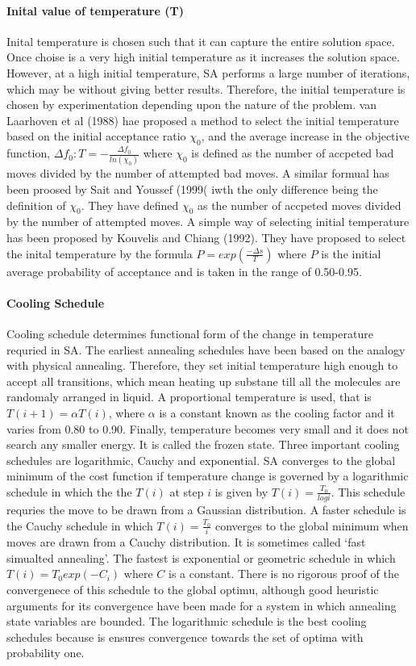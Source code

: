 \documentclass[pdftex,11pt]{article}
\begin{document}
\paragraph{Inital value of temperature (T)}
Inital temperature is chosen such that it can capture the entire solution space. Once choise is a very high initial temperature as it increases the solution space. However, at a high initial temperature, SA performs a large number of iterations, which may be without giving better results. Therefore, the initial temperature is chosen by experimentation depending upon the nature of the problem. van Laarhoven et al (1988) hae proposed a method to select the initial temperature based on the initial acceptance ratio $\chi_0$, and the average increase in the objective function, $\Delta f_0: T = -\frac{\Delta f_0}{ln(\chi_0)}$ where $\chi_0$ is defined as the number of accpeted bad moves divided by the number of attempted bad moves. A similar formual has been proosed by Sait and Youssef (1999( iwth the only difference being the definition of $\chi_0$. They have defined $\chi_0$ as the number of accpeted moves divided by the number of attempted moves. A simple way of selecting initial temperature has been proposed by Kouvelis and Chiang (1992). They have proposed to select the inital temperature by the formula $P = exp(\frac{-\Delta s}{T})$ where $P$ is the initial average probability of acceptance and is taken in the range of 0.50-0.95.

\paragraph{Cooling Schedule}
Cooling schedule determines functional form of the change in temperature requried in SA. The earliest annealing schedules have been based on the analogy with physical annealing. Therefore, they set initial temperature high enough to accept all transitions, which mean heating up substane till all the molecules are randomaly arranged in liquid. A proportional temperature is used, that is $T(i + 1) = \alpha T(i)$, where $\alpha$ is a constant known as the cooling factor and it varies from 0.80 to 0.90. Finally, temperature becomes very small and it does not search any smaller energy. It is called the frozen state. Three important cooling schedules are logarithmic, Cauchy and exponential. SA converges to the global minimum of the cost function if temperature change is governed by a logarithmic schedule in which the the $T(i)$ at step $i$ is given by $T(i)=\frac{T_0}{log i}$. This schedule requries the move to be drawn from a Gaussian distribution. A faster schedule is the Cauchy schedule in which $T(i) = \frac{T_0}{i}$ converges to the global minimum when moves are drawn from a Cauchy distribution. It is sometimes called `fast simualted annealing'. The fastest is exponential or geometric schedule in which $T(i)=T_0 exp(-C_i)$ where $C$ is a constant. There is no rigorous proof of the convergenece of this schedule to the global optimu, although good heuristic arguments for its convergence have been made for a system in which annealing state variables are bounded. The logarithmic schedule is the best cooling schedules because is ensures convergence towards the set of optima with probability one.
\end{document}
